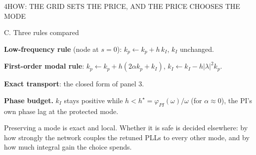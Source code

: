 \begin{minipage}[t][\PosterFourHeight][t]{\PosterGridWidth}
\begin{PosterPanel}{\PosterFourHeight}{4}{HOW: THE GRID SETS THE PRICE, AND THE PRICE CHOOSES THE MODE}
\begin{minipage}[t]{262mm}
      {\Subhead\color{IASDarkGreen}C. Three rules compared\par}\vspace{1mm}
      {\FigureSize \textbf{Low-frequency rule} (node at $s=0$): $k_p\!\leftarrow\!k_p+h\,k_I$, $k_I$ unchanged.\par}\vspace{1.5mm}
      {\FigureSize \textbf{First-order modal rule}: $k_p\!\leftarrow\!k_p+h(2\alpha k_p+k_I)$, $k_I\!\leftarrow\!k_I-h|\lambda|^{2}k_p$.\par}\vspace{1.5mm}
      {\FigureSize \textbf{Exact transport}: the closed form of panel 3.\par}
      \vspace{2mm}
      {\FigureSize \textbf{Phase budget.} $k_I$ stays positive while $h<h^{\star}=\varphi_{PI}(\omega)/\omega$ (for $\alpha\approx0$), the PI's own phase lag at the protected mode.\par}
    \end{minipage}\par
    \vspace{2mm}
    \begin{InWords}\InWordsLabel Preserving a mode is exact and local. Whether it is safe is decided elsewhere: by how strongly the network couples the retuned PLLs to every other mode, and by how much integral gain the choice spends.\end{InWords}

  \end{PosterPanel}
\end{minipage}%
